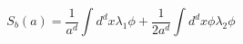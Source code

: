 \begin{equation}
S_b(a)= \frac 1 {a^{d}}\int d^dx \lambda_1 \phi +\frac 1 {2
a^{d}}\int d^dx \phi \lambda_2 \phi
\end{equation}

